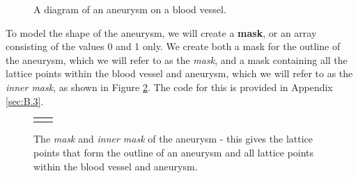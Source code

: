 \documentclass[a4paper, 11pt]{report}
\begin{document}
\begin{figure}[!htb]
\centering
{}
\caption{A diagram of an aneurysm on a blood vessel.} \label{fig:an_sketch}
\end{figure}


To model the shape of the aneurysm, we will create a \textbf{mask}, or an array consisting of the values 0 and 1 only. We create both a mask for the outline of the aneurysm, which we will refer to as the \textit{mask}, and a mask containing all the lattice points within the blood vessel and aneurysm, which we will refer to as the \emph{inner mask}, as shown in Figure \ref{fig:mask}. The code for this is provided in Appendix \ref{sec:B.3}.

\begin{figure}[!htb]
    \centering
    \begin{tabular}{p{}p{}}
         & 
    \end{tabular}
    \vspace{-5mm}
    \caption[Masks of the aneurysm]{The \emph{mask} and \emph{inner mask} of the aneurysm - this gives the lattice points that form the outline of an aneurysm and all lattice points within the blood vessel and aneurysm.} \label{fig:mask}
\end{figure}
\end{document}
